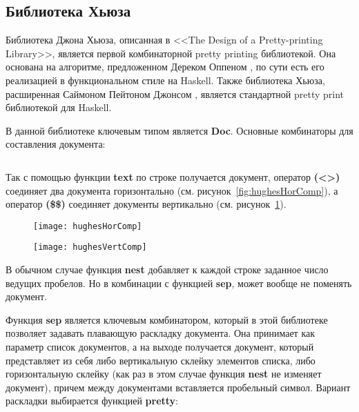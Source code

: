 \subsection{Библиотека Хьюза}

Библиотека Джона Хьюза, описанная в <<The Design of a Pretty-printing Library>>\cite{hughes}, является первой комбинаторной pretty printing библиотекой. Она основана на алгоритме, предложенном Дереком Оппеном \cite{oppen}, по сути есть его реализацией в функциональном стиле на Haskell. Также библиотека Хьюза, расширенная Саймоном Пейтоном Джонсом \cite{peytonJones}, является стандартной pretty print библиотекой для Haskell.


В данной библиотеке ключевым типом является \textbf{Doc}. Основные комбинаторы для составления документа:
\inputminted{haskell}{codes/hughesBasicOperators.hs}

Так с помощью функции \textbf{text} по строке получается документ, оператор \textbf{(<>)} соединяет два документа горизонтально (см. рисунок~\ref{fig:hughesHorComp}), а оператор \textbf{(\$\$)} соединяет документы вертикально (см. рисунок~\ref{fig:hughesVertComp}).

\begin{figure}[h!]
	\begin{minipage}[b]{0.45\linewidth}
		\centering
		\texttt{[image: hughesHorComp]}
		\caption{}
		\label{fig:hughesHorComp}
	\end{minipage}
	\hspace{0.5cm}
	\begin{minipage}[b]{0.45\linewidth}
		\centering
		\texttt{[image: hughesVertComp]}
		\caption{}
		\label{fig:hughesVertComp}
	\end{minipage}
\end{figure}

В обычном случае функция \textbf{nest} добавляет к каждой строке заданное число ведущих пробелов. Но в комбинации с функцией \textbf{sep}, может вообще не поменять документ.

Функция \textbf{sep} является ключевым комбинатором, который в этой библиотеке позволяет задавать плавающую раскладку документа. Она принимает как параметр список документов, а на выходе получается документ, который представляет из себя либо вертикальную склейку элементов списка, либо горизонтальную склейку (как раз в этом случае функция \textbf{nest} не изменяет документ), причем между документами вставляется пробельный символ. Вариант раскладки выбирается функцией \textbf{pretty}:

